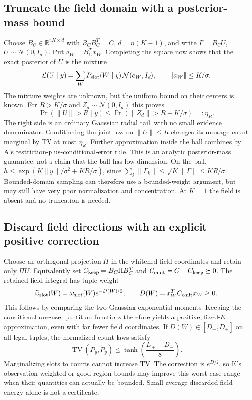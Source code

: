 \documentclass[10pt,a4paper]{article}
\newcommand{\TV}{\operatorname{TV}}
\begin{document}
\subsection{Truncate the field domain with a posterior-mass bound}
Choose $B_C\in\mathbb R^{nK\times d}$ with $B_CB_C^T=C$, $d=n(K-1)$, and write
$\Gamma=B_CU$, $U\sim\mathcal N(0,I_d)$. Put $a_W=B_C^Tx_W$.
Completing the square now shows that the exact posterior of $U$ is the mixture
\begin{equation}
 \mathcal L(U\mid y)=\sum_W P_{\rm slot}(W\mid y)\,
          \mathcal N(a_W,I_d),\qquad \|a_W\|\leq K/\sigma.
 \label{eq:field-gaussian-mixture}
\end{equation}
The mixture weights are unknown, but the uniform bound on their centers is known.
For $R>K/\sigma$ and $Z_d\sim\mathcal N(0,I_d)$ this proves
\begin{equation}
 \Pr(\|U\|>R\mid y)\leq
       \Pr(\|Z_d\|>R-K/\sigma)=:\eta_R.
 \label{eq:field-domain-tail}
\end{equation}
The right side is an ordinary Gaussian radial tail, with no small evidence denominator.
Conditioning the joint law on $\|U\|\leq R$ changes its message-count marginal by TV at most $\eta_R$.
Further approximation inside the ball combines by A's restriction-plus-conditional-error rule.
This is an analytic posterior-mass guarantee, not a claim that the ball has low dimension.
On the ball, $h\leq\exp(K\|y\|/\sigma^2+KR/\sigma)$, since
$\sum_k\|\Gamma_k\|\leq\sqrt K\|\Gamma\|\leq KR/\sigma$.
Bounded-domain sampling can therefore use a bounded-weight argument, but may still have very poor
normalization and concentration. At $K=1$ the field is absent and no truncation is needed.

\newpage
\subsection{Discard field directions with an explicit positive correction}
Choose an orthogonal projection $\Pi$ in the whitened field coordinates and retain only $\Pi U$.
Equivalently set $C_{\rm keep}=B_C\Pi B_C^T$ and
$C_{\rm omit}=C-C_{\rm keep}\succeq0$. The retained-field integral has tuple weight
\begin{equation}
 \widetilde\omega_{\rm slot}(W)
 =\omega_{\rm slot}(W)e^{-D(W)/2},\qquad
 D(W)=x_W^TC_{\rm omit}x_W\geq0.
 \label{eq:field-direction-drop}
\end{equation}
This follows by comparing the two Gaussian exponential moments. Keeping the conditional one-user
partition functions therefore yields a positive, fixed-$K$ approximation, even with far fewer field
coordinates. If $D(W)\in[D_-,D_+]$ on all legal tuples, the normalized count laws satisfy
\begin{equation}
 \TV(P_y,\widetilde P_y)\leq
       \tanh\!\left(\frac{D_+-D_-}{8}\right).
 \label{eq:field-direction-tv}
\end{equation}
Marginalizing slots to counts cannot increase TV. The correction is $e^{D/2}$, so K's
observation-weighted or good-region bounds may improve this worst-case range when their quantities can
actually be bounded. Small average discarded field energy alone is not a certificate.
\end{document}
